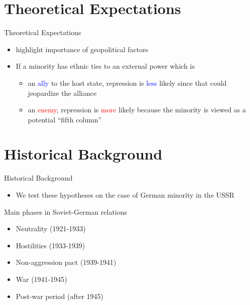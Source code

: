 \documentclass[11pt]{beamer}
\begin{document}
\section{Theoretical Expectations}
\begin{frame}{Theoretical Expectations}
\begin{itemize}
    \item  \citet{mylonas_politics_2013, butt_secession_2017} highlight importance of geopolitical factors 
    \item If a minority has ethnic ties to an external power
     which is  
    \begin{itemize}
        \item an \textcolor{blue}{ally}  to the host state, repression is \textcolor{blue}{less} likely since that could jeopardize the alliance
        \item an \textcolor{red}{enemy}, repression is \textcolor{red}{more}  likely because the minority is viewed as a potential \enquote{fifth column}

    \end{itemize}
    
\end{itemize}
\end{frame}

\section{Historical Background}
\begin{frame}{Historical Background}
\begin{itemize}
    \item We test these hypotheses on the case of German minority in the USSR
\end{itemize}

 \begin{block}{Main phases in Soviet-German relations}
    {
        \begin{itemize}
        \item Neutrality (1921-1933) 
        \item Hostilities (1933-1939)
        \item Non-aggression pact (1939-1941)
        \item War (1941-1945)
        \item Post-war period (after 1945)
        \end{itemize}
    }
    \end{block}
\end{frame}
\end{document}
